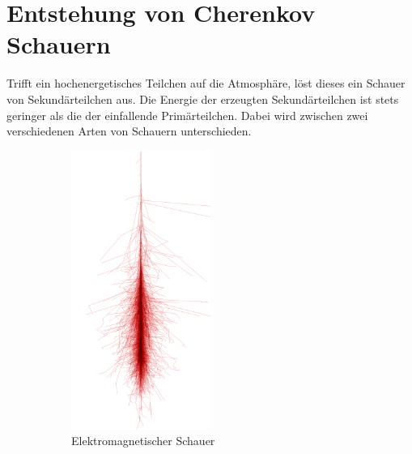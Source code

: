 \chapter{Entstehung von Cherenkov Schauern}
Trifft ein hochenergetisches Teilchen auf die Atmosphäre, löst dieses ein Schauer von Sekundärteilchen aus. Die Energie der erzeugten Sekundärteilchen ist stets geringer als die der einfallende Primärteilchen. Dabei wird zwischen zwei verschiedenen Arten von Schauern unterschieden. 
\begin{figure}[H]
  \centering
  \begin{subfigure}[t]{0.49\textwidth}
  	\centering
	\includegraphics[width=0.5\textwidth]{images/photon_100GeV.png}
	\caption{Elektromagnetischer Schauer}
  \end{subfigure}
  \begin{subfigure}[t]{0.49\textwidth}
  	\centering

\end{subfigure}
\end{figure}

